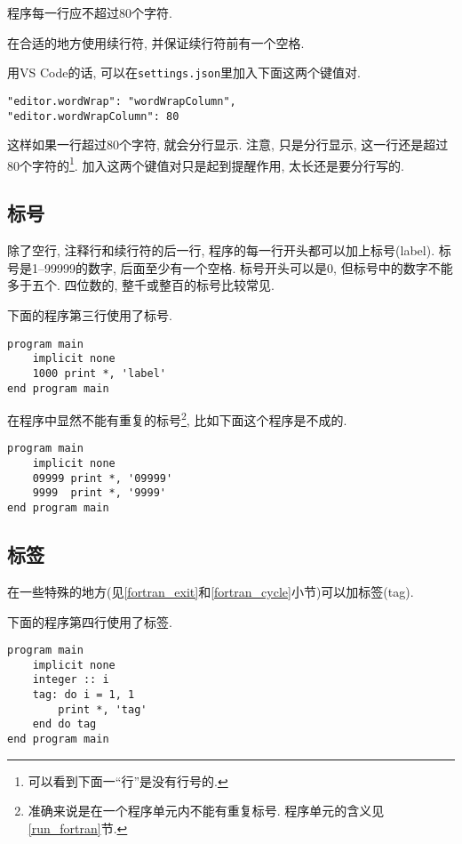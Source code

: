 \begin{convention}\label{fortran_no_more_than_80}
    程序每一行应不超过$80$个字符.
\end{convention}

\begin{convention}
    在合适的地方使用续行符, 并保证续行符前有一个空格.
\end{convention}

用VS Code的话, 可以在\texttt{settings.json}里加入下面这两个键值对.
\begin{lstlisting}
"editor.wordWrap": "wordWrapColumn",
"editor.wordWrapColumn": 80
\end{lstlisting}
这样如果一行超过80个字符, 就会分行显示. 注意, 只是分行显示, 这一行还是超过80个字符的\footnote{
    可以看到下面一``行''是没有行号的.
}. 加入这两个键值对只是起到提醒作用, 太长还是要分行写的.

\subsection{标号}

除了空行, 注释行和续行符的后一行, 程序的每一行开头都可以加上标号(label). 标号是1--99999的数字, 后面至少有一个空格. 标号开头可以是0, 但标号中的数字不能多于五个. 四位数的, 整千或整百的标号比较常见.

下面的程序第三行使用了标号.
\begin{lstlisting}
program main
    implicit none
    1000 print *, 'label'
end program main
\end{lstlisting}

在程序中显然不能有重复的标号\footnote{
    准确来说是在一个程序单元内不能有重复标号. 程序单元的含义见\ref{run_fortran}节.
}, 比如下面这个程序是不成的.\begin{lstlisting}
program main
    implicit none
    09999 print *, '09999'
    9999  print *, '9999'
end program main
\end{lstlisting}

\subsection{标签}

在一些特殊的地方(见\ref{fortran_exit}和\ref{fortran_cycle}小节)可以加标签(tag). 

下面的程序第四行使用了标签.
\begin{lstlisting}
program main
    implicit none
    integer :: i
    tag: do i = 1, 1
        print *, 'tag'
    end do tag
end program main
\end{lstlisting}

